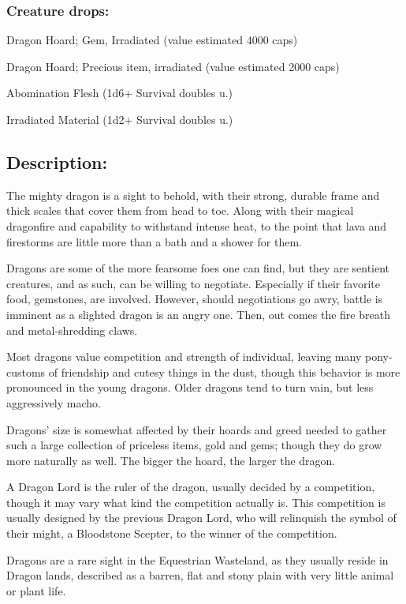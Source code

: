 \documentclass[11pt,a4paper,twocolumn]{book}
\begin{document}
	\subsubsection*{Creature drops:}
	\begin{compactitem}
		\item Dragon Hoard; Gem, Irradiated (value estimated 4000 caps)
		\item Dragon Hoard; Precious item, irradiated (value estimated 2000 caps)
		\item Abomination Flesh (1d6+ Survival doubles u.)
		\item Irradiated Material (1d2+ Survival doubles u.)
	\end{compactitem}
	
	\subsection*{Description:}
	The mighty dragon is a sight to behold, with their strong, durable frame and thick scales that cover them from head to toe. Along with their magical dragonfire and capability to withstand intense heat, to the point that lava and firestorms are little more than a bath and a shower for them.
	
	Dragons are some of the more fearsome foes one can find, but they are sentient creatures, and as such, can be willing to negotiate. Especially if their favorite food, gemstones, are involved. However, should negotiations go awry, battle is imminent as a slighted dragon is an angry one. Then, out comes the fire breath and metal-shredding claws.
	
	Most dragons value competition and strength of individual, leaving many pony-customs of friendship and cutesy things in the dust, though this behavior is more pronounced in the young dragons. Older dragons tend to turn vain, but less aggressively macho.
	
	Dragons' size is somewhat affected by their hoards and greed needed to gather such a large collection of priceless items, gold and gems; though they do grow more naturally as well. The bigger the hoard, the larger the dragon.
	
	\bigskip
	A Dragon Lord is the ruler of the dragon, usually decided by a competition, though it may vary what kind the competition actually is. This competition is usually designed by the previous Dragon Lord, who will relinquish the symbol of their might, a Bloodstone Scepter, to the winner of the competition.
	
	Dragons are a rare sight in the Equestrian Wasteland, as they usually reside in Dragon lands, described as a barren, flat and stony plain with very little animal or plant life.
	
\end{document}
